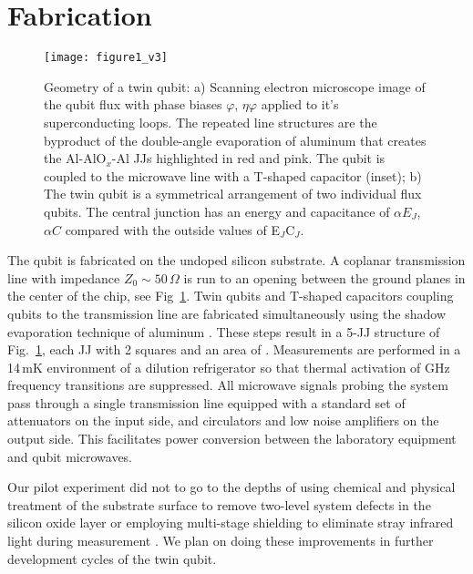 \section{Fabrication}


\begin{figure}[h]
  \texttt{[image: figure1\_v3]}
  \caption{\small Geometry of a twin qubit: a) Scanning electron microscope image
    of  the  qubit flux  with  phase  biases  $ \varphi  $,  $  \eta\varphi  $ applied  to  it's
    superconducting loops. The repeated line  structures are the byproduct of the
    double-angle  evaporation  of aluminum  that  creates  the Al-AlO$_x$-Al  JJs
    highlighted in red and pink. The qubit  is coupled to the microwave line with
    a T-shaped capacitor (inset); b) The  twin qubit is a symmetrical arrangement
    of  two individual  flux  qubits.  The  central junction  has  an energy  and
    capacitance  of  $ \alpha  E_{J}$,  $\alpha  C$ compared  with  the  outside values  of
    E$_J$C$_J$.}
  \label{fig:setup}
\end{figure}

\noindent The qubit  is fabricated on the undoped silicon  substrate.  A coplanar
transmission line with impedance  $ Z_{0} \sim 50\,\Omega $ is run  to an opening between
the  ground planes  in the  center of  the chip,  see Fig~\ref{fig:setup}.   Twin
qubits  and T-shaped  capacitors coupling  qubits  to the  transmission line  are
fabricated  simultaneously using  the  shadow evaporation  technique of  aluminum
\cite{wu2013}.  These steps  result in a 5-JJ  structure of Fig.~\ref{fig:setup},
each JJ with 2 squares and  an area of .  Measurements are
performed in  a 14\,mK  environment of  a dilution  refrigerator so  that thermal
activation of  GHz frequency transitions  are suppressed.  All  microwave signals
probing  the system  pass  through a  single transmission  line  equipped with  a
standard set  of attenuators  on the  input side, and  circulators and  low noise
amplifiers on  the output  side.  This facilitates  power conversion  between the
laboratory equipment and qubit microwaves.

Our pilot experiment did  not to go to the depths of  using chemical and physical
treatment of  the substrate  surface to  remove two-level  system defects  in the
silicon  oxide layer  \cite{earnest2018}  or employing  multi-stage shielding  to
eliminate stray infrared light during measurement \cite{barends2011}.  We plan on
doing these improvements in further development cycles of the twin qubit.





